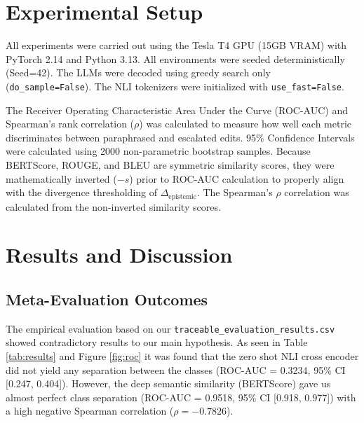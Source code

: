 \documentclass[acmsmall]{acmart}
\begin{document}
\section{Experimental Setup}

All experiments were carried out using the Tesla T4 GPU (15GB VRAM) with PyTorch 2.14 and Python 3.13. All environments were seeded deterministically (Seed=42). The LLMs were decoded using greedy search only (\texttt{do\_sample=False}). The NLI tokenizers were initialized with \texttt{use\_fast=False}.

The Receiver Operating Characteristic Area Under the Curve (ROC-AUC) and Spearman's rank correlation ($\rho$) was calculated to measure how well each metric discriminates between paraphrased and escalated edits. 95\% Confidence Intervals were calculated using 2000 non-parametric bootstrap samples. Because BERTScore, ROUGE, and BLEU are symmetric similarity scores, they were mathematically inverted ($-s$) prior to ROC-AUC calculation to properly align with the divergence thresholding of $\Delta_{\text{epistemic}}$. The Spearman's $\rho$ correlation was calculated from the non-inverted similarity scores.

\section{Results and Discussion}

\subsection{Meta-Evaluation Outcomes}

The empirical evaluation based on our \texttt{traceable\_evaluation\_results.csv} showed contradictory results to our main hypothesis. As seen in Table \ref{tab:results} and Figure \ref{fig:roc} it was found that the zero shot NLI cross encoder did not yield any separation between the classes (ROC-AUC = 0.3234, 95\% CI [0.247, 0.404]). However, the deep semantic similarity (BERTScore) gave us almost perfect class separation (ROC-AUC = 0.9518, 95\% CI [0.918, 0.977]) with a high negative Spearman correlation ($\rho = -0.7826$).
\end{document}
